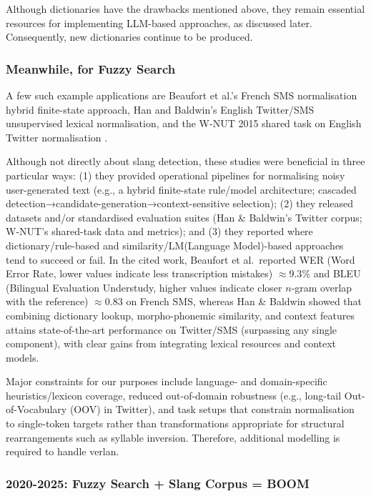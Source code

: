 \documentclass[12pt]{article}
\begin{document}
Although dictionaries have the drawbacks mentioned above, they remain essential resources for implementing LLM-based approaches, as discussed later. Consequently, new dictionaries continue to be produced.


\subsubsection{Meanwhile, for Fuzzy Search}

A few such example applications are Beaufort et al.'s French SMS normalisation hybrid finite-state approach, Han and Baldwin's English Twitter/SMS unsupervised lexical normalisation, and the W-NUT 2015 shared task on English Twitter normalisation \cite{beaufort2010hybrid,han2011lexical,baldwin2015shared}.

Although not directly about slang detection, these studies were beneficial in three particular ways: (1) they provided operational pipelines for normalising noisy user-generated text (e.g., a hybrid finite-state rule/model architecture; cascaded detection→candidate-generation→context-sensitive selection); (2) they released datasets and/or standardised evaluation suites (Han \& Baldwin's Twitter corpus; W-NUT's shared-task data and metrics); and (3) they reported where dictionary/rule-based and similarity/LM(Language Model)-based approaches tend to succeed or fail. In the cited work, Beaufort et al.\ reported WER (Word Error Rate, lower values indicate less transcription mistakes) $\approx 9.3\%$ and BLEU (Bilingual Evaluation Understudy, higher values indicate closer $n$-gram overlap with the reference) $\approx 0.83$ on French SMS, whereas Han \& Baldwin showed that combining dictionary lookup, morpho-phonemic similarity, and context features attains state-of-the-art performance on Twitter/SMS (surpassing any single component), with clear gains from integrating lexical resources and context models.

Major constraints for our purposes include language- and domain-specific heuristics/lexicon coverage, reduced out-of-domain robustness (e.g., long-tail Out-of-Vocabulary (OOV) in Twitter), and task setups that constrain normalisation to single-token targets rather than transformations appropriate for structural rearrangements such as syllable inversion. Therefore, additional modelling is required to handle verlan.


\subsubsection{2020-2025: Fuzzy Search + Slang Corpus = BOOM}
\end{document}
